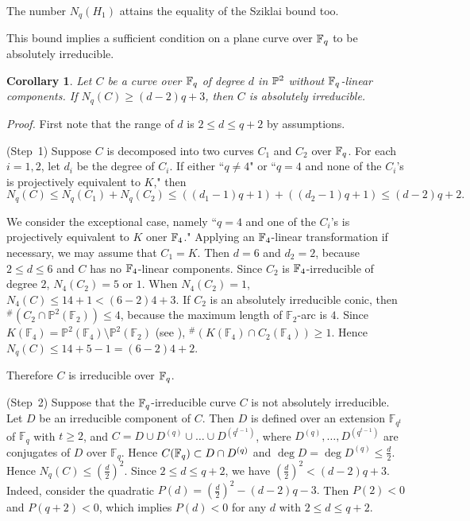 \documentclass[a4paper,11pt]{article}
\newtheorem{corollary}[theorem]{Corollary}
\newcommand{\proof}{\noindent \mbox{\em Proof.\hspace*{2mm}}}
\begin{document}
The number $N_q(H_1)$ attains the equality of the Sziklai bound too.

This bound implies a sufficient condition on a plane curve over ${\Bbb F}_q$
to be absolutely irreducible.

\begin{corollary}\label{absolutelyirreducible}
Let $C$ be a curve over ${\Bbb F}_q$ of degree $d$ in ${\Bbb P}^2$
without ${\Bbb F}_q$-linear components.
If $N_q(C) \geq (d-2)q +3$, then $C$ is absolutely irreducible.
\end{corollary}
\proof
First note that the range of $d$ is $2 \leq d \leq q+2$ by assumptions.

(Step~1) Suppose $C$ is decomposed into two curves $C_1$ and $C_2$ over
${\Bbb F}_q$.
For each $i =1, 2$, let $d_i$ be the degree of $C_i$.
If either ``$q\neq 4$" or 
``$q=4$ and none of the $C_i$'s is projectively equivalent to $K$,"
then
\[
N_q(C) \leq N_q(C_1)+N_q(C_2)
  \leq ((d_1-1)q + 1) +((d_2-1)q + 1)
\leq (d-2)q + 2.
\]

We consider the exceptional case, namely
``$q=4$ and one of the $C_i$'s is projectively equivalent to $K$
oner ${\Bbb F}_4$."
Applying an ${\Bbb F}_4$-linear transformation if necessary,
we may assume that $C_1=K$.
Then $d=6$ and $d_2=2$, because $2 \leq d \leq 6$ and
$C$ has no ${\Bbb F}_4$-linear components.
Since $C_2$ is ${\Bbb F}_4$-irreducible of degree $2$,
$N_4(C_2) =5$ or $1$.
When $N_4(C_2) =1$, $N_4(C) \leq 14 +1 < (6-2)4 + 3.$
If $C_2$ is an absolutely irreducible conic,
then ${}^{\#}(C_2 \cap \mathbb{P}^2(\mathbb{F}_2)) \leq 4$,
because the maximum length of $\mathbb{F}_2$-arc is $4$.
Since $K(\mathbb{F}_4) =
\mathbb{P}^2(\mathbb{F}_4) \setminus \mathbb{P}^2(\mathbb{F}_2)$
(see \cite[\S 3]{hom-kim2009}),
${}^{\#}(K(\mathbb{F}_4) \cap C_2(\mathbb{F}_4))\geq 1$.
Hence
$N_q(C) \leq 14 + 5 -1 = (6-2)4+2.$

Therefore $C$ is irreducible over ${\Bbb F}_q$.

(Step~2)
Suppose that the ${\Bbb F}_q$-irreducible curve $C$
is not absolutely irreducible.
Let $D$ be an irreducible component of $C$.
Then $D$ is defined over an extension $\mathbb{F}_{q^t}$ of $\mathbb{F}_q$
with $t \geq 2$, and
$C= D \cup D^{(q)} \cup \dots \cup D^{(q^{t-1})}$,
where $D^{(q)},  \dots , D^{(q^{t-1})}$
are conjugates of $D$ over $\mathbb{F}_q$.
Hence $C({\Bbb F}_q) \subset D \cap D^{(q)}$ and
$\deg D = \deg D^{(q)} \leq \frac{d}{2}.$
Hence $N_q(C) \leq \left( \frac{d}{2}\right)^2$.
Since $2 \leq d \leq q+2$,
we have $\left( \frac{d}{2}\right)^2< (d-2)q + 3$.
Indeed, consider the quadratic
$P(d) = \left( \frac{d}{2}\right)^2 - (d-2)q - 3.$
Then $P(2)<0$ and $P(q+2)<0$, which implies
$P(d)<0$ for any $d$ with $2 \leq d \leq q+2$.
\end{document}
